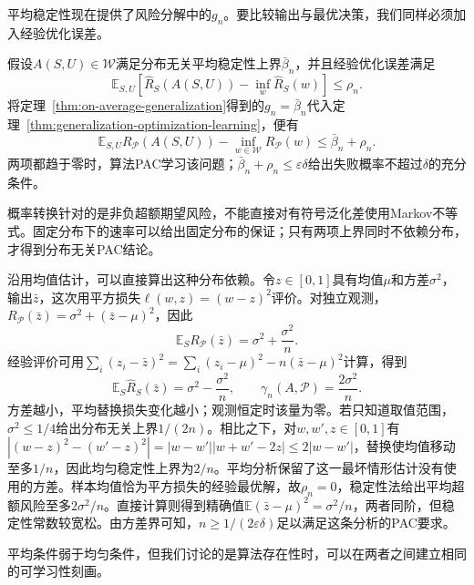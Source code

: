 平均稳定性现在提供了风险分解中的$g_n$。要比较输出与最优决策，我们同样必须加入经验优化误差。

假设$A(S,U)\in\mathcal W$满足分布无关平均稳定性上界$\bar\beta_n$，并且经验优化误差满足
\[
 \mathbb E_{S,U}[\hat R_S(A(S,U))-\inf_w\hat R_S(w)]\leq\rho_n.
\]
将定理~\ref{thm:on-average-generalization}得到的$g_n=\bar\beta_n$代入定理~\ref{thm:generalization-optimization-learning}，便有
\begin{equation}
 \mathbb E_{S,U}R_{\mathcal P}(A(S,U))-
 \inf_{w\in\mathcal W}R_{\mathcal P}(w)\leq\bar\beta_n+\rho_n.
 \label{eq:stability-excess-risk}
\end{equation}
两项都趋于零时，算法PAC学习该问题；$\bar\beta_n+\rho_n\leq\varepsilon\delta$给出失败概率不超过$\delta$的充分条件。

概率转换针对的是非负超额期望风险，不能直接对有符号泛化差使用Markov不等式。固定分布下的速率可以给出固定分布的保证；只有两项上界同时不依赖分布，才得到分布无关PAC结论。

沿用均值估计，可以直接算出这种分布依赖。令$z\in[0,1]$具有均值$\mu$和方差$\sigma^2$，输出$\bar z$，这次用平方损失$\ell(w,z)=(w-z)^2$评价。对独立观测，$R_{\mathcal P}(\bar z)=\sigma^2+(\bar z-\mu)^2$，因此
\[
 \mathbb E_S R_{\mathcal P}(\bar z)=\sigma^2+\frac{\sigma^2}{n}.
\]
经验评价可用$\sum_i(z_i-\bar z)^2=\sum_i(z_i-\mu)^2-n(\bar z-\mu)^2$计算，得到
\[
 \mathbb E_S\hat R_S(\bar z)=\sigma^2-\frac{\sigma^2}{n},
 \qquad \gamma_n(A,\mathcal P)=\frac{2\sigma^2}{n}.
\]
方差越小，平均替换损失变化越小；观测恒定时该量为零。若只知道取值范围，$\sigma^2\leq1/4$给出分布无关上界$1/(2n)$。相比之下，对$w,w',z\in[0,1]$有$|(w-z)^2-(w'-z)^2|=|w-w'||w+w'-2z|\leq2|w-w'|$，替换使均值移动至多$1/n$，因此均匀稳定性上界为$2/n$。平均分析保留了这一最坏情形估计没有使用的方差。样本均值恰为平方损失的经验最优解，故$\rho_n=0$，稳定性法给出平均超额风险至多$2\sigma^2/n$。直接计算则得到精确值$\mathbb E(\bar z-\mu)^2=\sigma^2/n$，两者同阶，但稳定性常数较宽松。由方差界可知，$n\geq1/(2\varepsilon\delta)$足以满足这条分析的PAC要求。

平均条件弱于均匀条件，但我们讨论的是算法存在性时，可以在两者之间建立相同的可学习性刻画。

